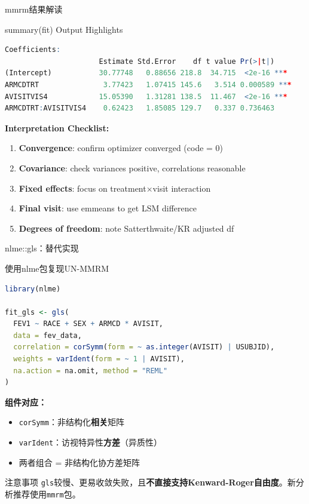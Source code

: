 \documentclass[aspectratio=169,11pt]{beamer}
\begin{document}
\begin{frame}[fragile]{mmrm结果解读}
\begin{block}{summary(fit) Output Highlights}
\begin{lstlisting}[language=R,numbers=none,basicstyle=\ttfamily\tiny]
Coefficients:
                      Estimate Std.Error    df t value Pr(>|t|)
(Intercept)           30.77748   0.88656 218.8  34.715  <2e-16 ***
ARMCDTRT               3.77423   1.07415 145.6   3.514 0.000589 ***
AVISITVIS4            15.05390   1.31281 138.5  11.467  <2e-16 ***
ARMCDTRT:AVISITVIS4    0.62423   1.85085 129.7   0.337 0.736463
\end{lstlisting}
\end{block}

\textbf{Interpretation Checklist:}
\begin{enumerate}
    \item \textbf{Convergence}: confirm optimizer converged (code = 0)
    \item \textbf{Covariance}: check variances positive, correlations reasonable
    \item \textbf{Fixed effects}: focus on treatment$\times$visit interaction
    \item \textbf{Final visit}: use emmeans to get LSM difference
    \item \textbf{Degrees of freedom}: note Satterthwaite/KR adjusted df
\end{enumerate}
\end{frame}

\begin{frame}[fragile]{nlme::gls：替代实现}
\begin{block}{使用nlme包复现UN-MMRM}
\begin{lstlisting}[language=R,basicstyle=\ttfamily\scriptsize]
library(nlme)

fit_gls <- gls(
  FEV1 ~ RACE + SEX + ARMCD * AVISIT,
  data = fev_data,
  correlation = corSymm(form = ~ as.integer(AVISIT) | USUBJID),
  weights = varIdent(form = ~ 1 | AVISIT),
  na.action = na.omit, method = "REML"
)
\end{lstlisting}
\end{block}

\textbf{组件对应：}
\begin{itemize}
    \item \texttt{corSymm}：非结构化\textbf{相关}矩阵
    \item \texttt{varIdent}：访视特异性\textbf{方差}（异质性）
    \item 两者组合 = 非结构化协方差矩阵
\end{itemize}

\begin{alertblock}{注意事项}
\texttt{gls}较慢、更易收敛失败，且\textbf{不直接支持Kenward-Roger自由度}。新分析推荐使用\texttt{mmrm}包。
\end{alertblock}
\end{frame}
\end{document}
